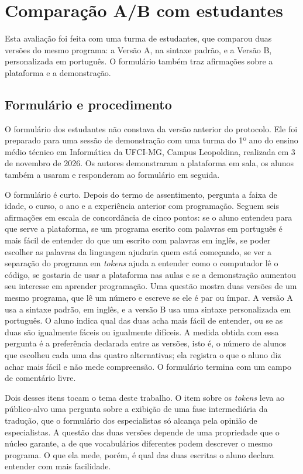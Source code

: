 \section{Comparação A/B com estudantes}
\label{sec:avaliacao-estudantes}

Esta avaliação foi feita com uma turma de estudantes, que comparou duas versões do mesmo programa: a Versão A, na sintaxe padrão, e a Versão B, personalizada em português. O formulário também traz afirmações sobre a plataforma e a demonstração.

\subsection{Formulário e procedimento}
\label{subsec:formulario-estudantes}

O formulário dos estudantes não constava da versão anterior do protocolo. Ele foi preparado para uma sessão de demonstração com uma turma do 1º ano do ensino médio técnico em Informática da UFCI-MG, Campus Leopoldina, realizada em 3 de novembro de 2026. Os autores demonstraram a plataforma em sala, os alunos também a usaram e responderam ao formulário em seguida.

O formulário é curto. Depois do termo de assentimento, pergunta a faixa de idade, o curso, o ano e a experiência anterior com programação. Seguem seis afirmações em escala de concordância de cinco pontos: se o aluno entendeu para que serve a plataforma, se um programa escrito com palavras em português é mais fácil de entender do que um escrito com palavras em inglês, se poder escolher as palavras da linguagem ajudaria quem está começando, se ver a separação do programa em \textit{tokens} ajuda a entender como o computador lê o código, se gostaria de usar a plataforma nas aulas e se a demonstração aumentou seu interesse em aprender programação. Uma questão mostra duas versões de um mesmo programa, que lê um número e escreve se ele é par ou ímpar. A versão A usa a sintaxe padrão, em inglês, e a versão B usa uma sintaxe personalizada em português. O aluno indica qual das duas acha mais fácil de entender, ou se as duas são igualmente fáceis ou igualmente difíceis. A medida obtida com essa pergunta é a preferência declarada entre as versões, isto é, o número de alunos que escolheu cada uma das quatro alternativas; ela registra o que o aluno diz achar mais fácil e não mede compreensão. O formulário termina com um campo de comentário livre.

Dois desses itens tocam o tema deste trabalho. O item sobre os \textit{tokens} leva ao público-alvo uma pergunta sobre a exibição de uma fase intermediária da tradução, que o formulário dos especialistas só alcança pela opinião de especialistas. A questão das duas versões depende de uma propriedade que o núcleo garante, a de que vocabulários diferentes podem descrever o mesmo programa. O que ela mede, porém, é qual das duas escritas o aluno declara entender com mais facilidade.

